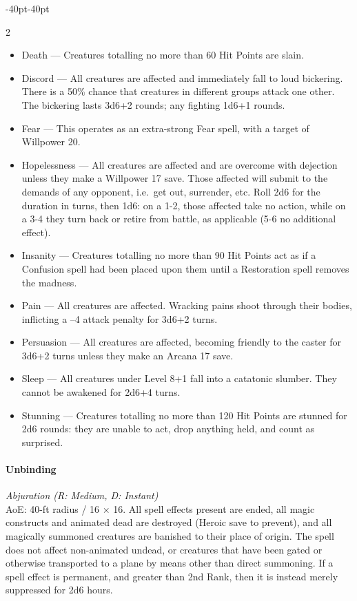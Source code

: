 \documentclass{book}
\providecommand{\tightlist}{%
\setlength{\itemsep}{0pt}\setlength{\parskip}{0pt}}
\begin{document}
\begin{adjustwidth}{-40pt}{-40pt}
\begin{multicols}{2}
\begin{itemize}
	\tightlist
	\item
	Death --- Creatures totalling no more than 60 Hit Points are slain.
	\item
	Discord --- All creatures are affected and immediately fall to loud
	bickering. There is a 50\% chance that creatures in different groups
	attack one other. The bickering lasts 3d6+2 rounds; any fighting 1d6+1
	rounds.
	\item
	Fear --- This operates as an extra-strong Fear spell, with a target of
	Willpower 20.
	\item
	Hopelessness --- All creatures are affected and are overcome with
	dejection unless they make a Willpower 17 save. Those affected will
	submit to the demands of any opponent, i.e.~get out, surrender, etc.
	Roll 2d6 for the duration in turns, then 1d6: on a 1-2, those affected
	take no action, while on a 3-4 they turn back or retire from battle,
	as applicable (5-6 no additional effect).
	\item
	Insanity --- Creatures totalling no more than 90 Hit Points act as if
	a Confusion spell had been placed upon them until a Restoration spell
	removes the madness.
	\item
	Pain --- All creatures are affected. Wracking pains shoot through
	their bodies, inflicting a --4 attack penalty for 3d6+2 turns.
	\item
	Persuasion --- All creatures are affected, becoming friendly to the
	caster for 3d6+2 turns unless they make an Arcana 17 save.
	\item
	Sleep --- All creatures under Level 8+1 fall into a catatonic slumber.
	They cannot be awakened for 2d6+4 turns.
	\item
	Stunning --- Creatures totalling no more than 120 Hit Points are
	stunned for 2d6 rounds: they are unable to act, drop anything held,
	and count as surprised.
\end{itemize}

\paragraph{Unbinding}\label{unbinding}

\emph{Abjuration (R: Medium, D: Instant)}\\
AoE: 40-ft radius / 16 × 16. All spell effects present are ended, all
magic constructs and animated dead are destroyed (Heroic save to
prevent), and all magically summoned creatures are banished to their
place of origin. The spell does not affect non-animated undead, or
creatures that have been gated or otherwise transported to a plane by
means other than direct summoning. If a spell effect is permanent, and
greater than 2nd Rank, then it is instead merely suppressed for 2d6
hours.


\end{multicols}
\end{adjustwidth}
\end{document}
